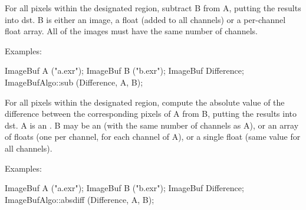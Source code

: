 

For all pixels within the designated region, subtract {\cf B} from {\cf A},
putting the results into {\cf dst}. {\cf B} is either an image, a float
(added to all channels) or a per-channel float array. All of the images must
have the same number of channels.

\smallskip
\noindent Examples:
\begin{code}
    ImageBuf A ("a.exr");
    ImageBuf B ("b.exr");
    ImageBuf Difference;
    ImageBufAlgo::sub (Difference, A, B);
\end{code}
\apiend


 

For all pixels within the designated region, compute the absolute value of
the difference between the corresponding pixels of {\cf A} from {\cf B},
putting the results into {\cf dst}. {\cf A} is an \ImageBuf.  {\cf B} may be
an \ImageBuf (with the same number of channels as {\cf A}), or an array of
floats (one per channel, for each channel of {\cf A}), or a single float
(same value for all channels).

\smallskip
\noindent Examples:
\begin{code}
    ImageBuf A ("a.exr");
    ImageBuf B ("b.exr");
    ImageBuf Difference;
    ImageBufAlgo::absdiff (Difference, A, B);
\end{code}
\apiend


